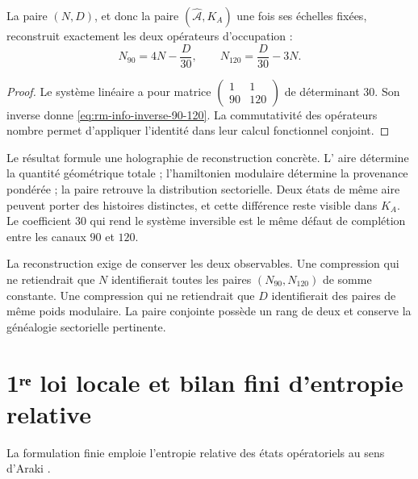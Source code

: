 \begin{theorem}
\label{thm:rm-info-reconstruction-90-120}
La paire \((N,D)\), et donc la paire
\((\widehat{\mathcal A},K_A)\) une fois ses échelles fixées, reconstruit
exactement les deux opérateurs d'occupation :
\begin{equation}
 \boxed{
 N_{90}=4N-\frac{D}{30},
 \qquad
 N_{120}=\frac{D}{30}-3N.}
 \label{eq:rm-info-inverse-90-120}
\end{equation}
\end{theorem}

\begin{proof}
Le système linéaire a pour matrice
\(\left(\begin{smallmatrix}1&1\\90&120\end{smallmatrix}\right)\)
de déterminant \(30\). Son inverse donne
\cref{eq:rm-info-inverse-90-120}. La commutativité des opérateurs
nombre permet d'appliquer l'identité dans leur calcul fonctionnel conjoint.
\end{proof}

Le résultat formule une holographie de reconstruction concrète. L'
aire détermine la quantité géométrique totale ; l'hamiltonien modulaire
détermine la provenance pondérée ; la paire retrouve la distribution
sectorielle. Deux états de même aire peuvent porter des histoires
distinctes, et cette différence reste visible dans \(K_A\). Le coefficient
\(30\) qui rend le système inversible est le même défaut de complétion
entre les canaux \(90\) et \(120\).

La reconstruction exige de conserver les deux observables. Une compression qui
ne retiendrait que \(N\) identifierait toutes les paires
\((N_{90},N_{120})\) de somme constante. Une compression qui ne retiendrait que
\(D\) identifierait des paires de même poids modulaire. La paire conjointe possède un
rang de deux et conserve la généalogie sectorielle pertinente.

\section{1ʳᵉ loi locale et bilan fini d'entropie relative}

La formulation finie emploie l'entropie relative des états opératoriels
au sens d'Araki \cite{Araki1976}.

